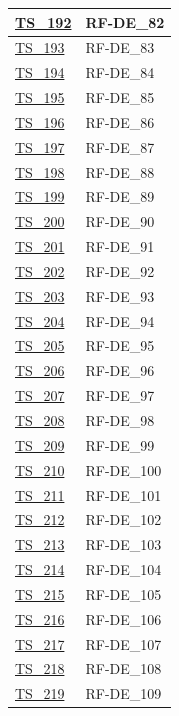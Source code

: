 \begin{longtable}{|
    >{\raggedright\arraybackslash}p{} |
    >{\centering\arraybackslash}p{} |
    }
    \hyperlink{ts-192}{TS\_192} & RF-DE\_82 \\ \hline
    \hyperlink{ts-193}{TS\_193} & RF-DE\_83 \\ \hline
    \hyperlink{ts-194}{TS\_194} & RF-DE\_84 \\ \hline
    \hyperlink{ts-195}{TS\_195} & RF-DE\_85 \\ \hline
    \hyperlink{ts-196}{TS\_196} & RF-DE\_86 \\ \hline
    \hyperlink{ts-197}{TS\_197} & RF-DE\_87 \\ \hline
    \hyperlink{ts-198}{TS\_198} & RF-DE\_88 \\ \hline
    \hyperlink{ts-199}{TS\_199} & RF-DE\_89 \\ \hline
    \hyperlink{ts-200}{TS\_200} & RF-DE\_90 \\ \hline
    \hyperlink{ts-201}{TS\_201} & RF-DE\_91 \\ \hline
    \hyperlink{ts-202}{TS\_202} & RF-DE\_92 \\ \hline
    \hyperlink{ts-203}{TS\_203} & RF-DE\_93 \\ \hline
    \hyperlink{ts-204}{TS\_204} & RF-DE\_94 \\ \hline
    \hyperlink{ts-205}{TS\_205} & RF-DE\_95 \\ \hline
    \hyperlink{ts-206}{TS\_206} & RF-DE\_96 \\ \hline
    \hyperlink{ts-207}{TS\_207} & RF-DE\_97 \\ \hline
    \hyperlink{ts-208}{TS\_208} & RF-DE\_98 \\ \hline
    \hyperlink{ts-209}{TS\_209} & RF-DE\_99 \\ \hline
    \hyperlink{ts-210}{TS\_210} & RF-DE\_100 \\ \hline
    \hyperlink{ts-211}{TS\_211} & RF-DE\_101 \\ \hline
    \hyperlink{ts-212}{TS\_212} & RF-DE\_102 \\ \hline
    \hyperlink{ts-213}{TS\_213} & RF-DE\_103 \\ \hline
    \hyperlink{ts-214}{TS\_214} & RF-DE\_104 \\ \hline
    \hyperlink{ts-215}{TS\_215} & RF-DE\_105 \\ \hline
    \hyperlink{ts-216}{TS\_216} & RF-DE\_106 \\ \hline
    \hyperlink{ts-217}{TS\_217} & RF-DE\_107 \\ \hline
    \hyperlink{ts-218}{TS\_218} & RF-DE\_108 \\ \hline
    \hyperlink{ts-219}{TS\_219} & RF-DE\_109 \\ \hline

\end{longtable}
